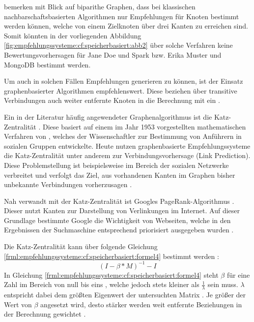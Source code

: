 \textcite[S. 7ff.]{huang:2004} bemerken mit Blick auf biparithe Graphen, dass bei klassischen nachbarschaftsbasierten Algorithmen nur Empfehlungen für Knoten bestimmt werden können, welche von einem Zielknoten über drei Kanten zu erreichen sind. Somit könnten in der vorliegenden Abbildung \ref{fig:empfehlungssysteme:cf:speicherbasiert:abb2} über solche Verfahren keine Bewertungsvorhersagen für Jane Doe und Spark bzw. Erika Muster und MongoDB bestimmt werden.

Um auch in solchen Fällen Empfehlungen generieren zu können, ist der Einsatz graphenbasierter Algorithmen empfehlenswert. Diese beziehen über transitive Verbindungen auch weiter entfernte Knoten in die Berechnung mit ein \cite[S. 60f.]{recommenderSystems:2016}.

Ein in der Literatur häufig angewendeter Graphenalgorithmus ist die Katz-Zentralität \cite[S. 1ff.]{zhan:2017}\cite[S. 6]{guns:2014}\cite[S. 1f.]{huang:2004}. Diese basiert auf einem im Jahr 1953 vorgestellten mathematischen Verfahren von \textcite[S. 1ff.]{katz:1953}, welches der Wissenschaftler zur Bestimmung von Anführern in sozialen Gruppen entwickelte. Heute nutzen graphenbasierte Empfehlungssysteme die Katz-Zentralität unter anderem zur Verbindungsvorhersage (Link Prediction). Diese Problemstellung ist beispielsweise im Bereich der sozialen Netzwerke verbreitet und verfolgt das Ziel, aus vorhandenen Kanten im Graphen bisher unbekannte Verbindungen vorherzusagen \cite[S. 1ff.]{libenNowell:2007}.

Nah verwandt mit der Katz-Zentralität ist Googles PageRank-Algorithmus \cite[S. 1]{was:2018}. Dieser nutzt Kanten zur Darstellung von Verlinkungen im Internet. Auf dieser Grundlage bestimmte Google die Wichtigkeit von Webseiten, welche in den Ergebnissen der Suchmaschine entsprechend priorisiert ausgegeben wurden \cite[S. 3ff.]{page:1999}.

Die Katz-Zentralität kann über folgende Gleichung \ref{frml:empfehlungssysteme:cf:speicherbasiert:formel4} bestimmt werden \cite[S. 4]{libenNowell:2007}:
\begin{equation}
	(I - \beta * M)^{-1} - I
	\label{frml:empfehlungssysteme:cf:speicherbasiert:formel4}
\end{equation}
In Gleichung \ref{frml:empfehlungssysteme:cf:speicherbasiert:formel4} steht $\beta$ für eine Zahl im Bereich von null bis eins \cite[S. 6]{guns:2014}, welche jedoch stets kleiner als $\frac{1}{\lambda}$ sein muss. $\lambda$ entspricht dabei dem größten Eigenwert der untersuchten Matrix \cite[S. 6]{zhan:2017}. Je größer der Wert von $\beta$ angesetzt wird, desto stärker werden weit entfernte Beziehungen in der Berechnung gewichtet \cite[S. 6]{guns:2014}.

